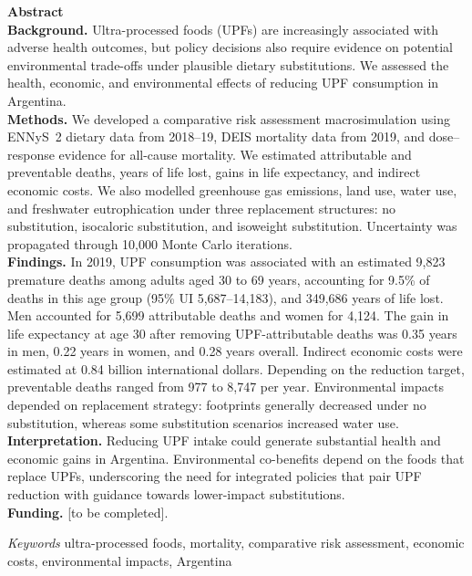 \documentclass{article}
\begin{document}
\begin{center}
\begin{minipage}{0.80\textwidth}
\noindent \textbf{\large{Abstract}} \\

\noindent \textbf{Background.} Ultra-processed foods (UPFs) are increasingly associated with adverse health outcomes, but policy decisions also require evidence on potential environmental trade-offs under plausible dietary substitutions. We assessed the health, economic, and environmental effects of reducing UPF consumption in Argentina. \\

\textbf{Methods.} We developed a comparative risk assessment macrosimulation using ENNyS~2 dietary data from 2018--19, DEIS mortality data from 2019, and dose--response evidence for all-cause mortality. We estimated attributable and preventable deaths, years of life lost, gains in life expectancy, and indirect economic costs. We also modelled greenhouse gas emissions, land use, water use, and freshwater eutrophication under three replacement structures: no substitution, isocaloric substitution, and isoweight substitution. Uncertainty was propagated through 10,000 Monte Carlo iterations.\\

\textbf{Findings.} In 2019, UPF consumption was associated with an estimated 9,823 premature deaths among adults aged 30 to 69 years, accounting for 9.5\% of deaths in this age group (95\% UI 5,687--14,183), and 349,686 years of life lost. Men accounted for 5,699 attributable deaths and women for 4,124. The gain in life expectancy at age 30 after removing UPF-attributable deaths was 0.35 years in men, 0.22 years in women, and 0.28 years overall. Indirect economic costs were estimated at 0.84 billion international dollars. Depending on the reduction target, preventable deaths ranged from 977 to 8,747 per year. Environmental impacts depended on replacement strategy: footprints generally decreased under no substitution, whereas some substitution scenarios increased water use.\\

\textbf{Interpretation.} Reducing UPF intake could generate substantial health and economic gains in Argentina. Environmental co-benefits depend on the foods that replace UPFs, underscoring the need for integrated policies that pair UPF reduction with guidance towards lower-impact substitutions. \\
\textbf{Funding.} [to be completed].

\vspace{0.5cm}
\noindent \textit{Keywords} ultra-processed foods, mortality, comparative risk assessment, economic costs, environmental impacts, Argentina \\
\end{minipage}
\end{center}
\end{document}
